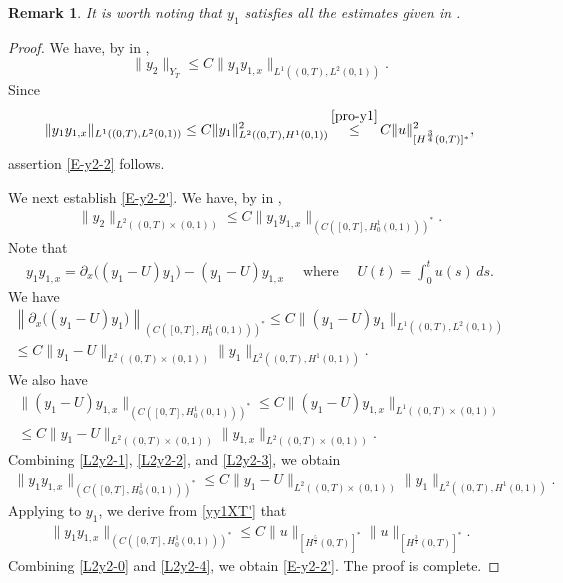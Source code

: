 \documentclass[11pt, reqno]{amsart}
\theoremstyle{plain}
\newtheorem{remark}{Remark}
\numberwithin{equation}{section}
\begin{document}
\begin{remark} \rm \label{rem-y1-2} It is worth noting that $y_1$ satisfies all the estimates given in .  
\end{remark}

\begin{proof}
	We have, by  in ,  
	$$	
			\|y_2 \|_{Y_T} \le C \|y_1 y_{1, x} \|_{L^1((0, T), L^2(0, 1))}. 
	$$
Since
$$	
			 \|y_1 y_{1, x} \|_{L^1((0, T), L^2(0, 1))} 	\leq C \|y_1 \|_{L^2((0, T), H^1(0, 1))}^2 		\mathop{\leq}^{\Cref{pro-y1}} C \| u\|^2_{[H^{\frac{3}{4}}(0, T)]^*}, 
$$
assertion \eqref{E-y2-2} follows.

\medskip
	
	We next establish \eqref{E-y2-2'}. We have, by  in , 
	\begin{align}	\label{L2y2-0}
		\|y_2 \|_{L^2((0, T) \times (0, 1))} \le C \|y_1 y_{1, x} \|_{ \left(C \left([0, T], H^1_0(0, 1) \right) \right)^*}.
	\end{align}
Note that
	\begin{align}	\label{L2y2-1}
		y_1 y_{1, x} =  \partial_x\Big((y_1 - U) y_1  \Big) - (y_1 - U) y_{1, x} \quad \mbox{ where } \quad U(t) = \int_0^t u(s) \, ds. 
	\end{align}
We have
\begin{multline}	\label{L2y2-2}
	\left \| \partial_x \Big( (y_1 - U) y_1 \Big) \right \|_{\left(C \left([0, T], H^1_0(0, 1) \right)  \right)^*} \leq C \| (y_1 - U) y_1 \|_{L^1((0, T), L^2(0, 1))} \\[6pt]
	\le 
		 C \|y_1 - U \|_{L^2((0, T) \times (0, 1))} \|y_1 \|_{L^2((0, T), H^1(0, 1))}.
\end{multline}
We also have 
	\begin{multline}	\label{L2y2-3}
		\| (y_1 - U) y_{1, x}\|_{\left(C \left([0, T], H^1_0(0, 1) \right)  \right)^*} \leq C \| (y_1 - U) y_{1, x}\|_{L^1((0, T) \times (0, 1))} \\[6pt]
		 \leq C \|y_1 - U\|_{L^2((0, T) \times (0, 1))} \|y_{1, x} \|_{L^2((0, T) \times (0, 1))}.
	\end{multline}
	Combining \eqref{L2y2-1}, \eqref{L2y2-2}, and \eqref{L2y2-3}, we obtain
	\begin{align}	\label{yy1XT'}
		\| y_1 y_{1, x} \|_{\left(C \left([0, T], H^1_0(0, 1) \right)  \right)^*} \leq C \|y_1 - U\|_{L^2((0, T) \times (0, 1))} \|y_1 \|_{L^2((0, T), H^1(0, 1))}.
	\end{align}
	Applying  to $y_1$, we derive from \eqref{yy1XT'} that
\begin{align}
		 \|y_1 y_{1, x} \|_{\left(C \left([0, T], H^1_0(0, 1) \right)  \right)^*}   \le C \|u\|_{[H^{\frac{5}{4}}(0, T)]^*} \|u\|_{[H^{\frac{3}{4}}(0, T)]^*}.	\label{L2y2-4}
	\end{align}			
Combining \eqref{L2y2-0} and \eqref{L2y2-4}, we obtain \eqref{E-y2-2'}. The proof is complete. 
\end{proof}
\end{document}
